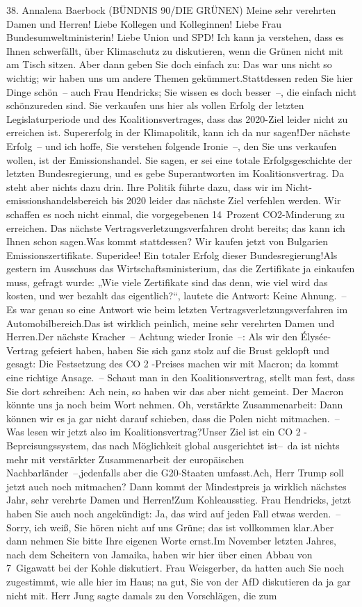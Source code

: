 \documentclass{article}
\begin{document}
	38. Annalena Baerbock (BÜNDNIS 90/DIE GRÜNEN) Meine sehr verehrten Damen und Herren! Liebe Kollegen und Kolleginnen! Liebe Frau Bundesumweltministerin! Liebe Union und SPD! Ich kann ja verstehen, dass es Ihnen schwerfällt, über Klimaschutz zu diskutieren, wenn die Grünen nicht mit am Tisch sitzen. Aber dann geben Sie doch einfach zu: Das war uns nicht so wichtig; wir haben uns um andere Themen gekümmert.Stattdessen reden Sie hier Dinge schön – auch Frau Hendricks; Sie wissen es doch besser –, die einfach nicht schönzureden sind. Sie verkaufen uns hier als vollen Erfolg der letzten Legislaturperiode und des Koalitionsvertrages, dass das 2020-Ziel leider nicht zu erreichen ist. Supererfolg in der Klimapolitik, kann ich da nur sagen!Der nächste Erfolg – und ich hoffe, Sie verstehen folgende Ironie –, den Sie uns verkaufen wollen, ist der Emissionshandel. Sie sagen, er sei eine totale Erfolgsgeschichte der letzten Bundesregierung, und es gebe Superantworten im Koalitionsvertrag. Da steht aber nichts dazu drin. Ihre Politik führte dazu, dass wir im Nicht­emissionshandelsbereich bis 2020 leider das nächste Ziel verfehlen werden. Wir schaffen es noch nicht einmal, die vorgegebenen 14 Prozent CO2-Minderung zu erreichen. Das nächste Vertragsverletzungsverfahren droht bereits; das kann ich Ihnen schon sagen.Was kommt stattdessen? Wir kaufen jetzt von Bulgarien Emissionszertifikate. Superidee! Ein totaler Erfolg dieser Bundesregierung!Als gestern im Ausschuss das Wirtschaftsministerium, das die Zertifikate ja einkaufen muss, gefragt wurde: „Wie viele Zertifikate sind das denn, wie viel wird das kosten, und wer bezahlt das eigentlich?“, lautete die Antwort: Keine Ahnung. – Es war genau so eine Antwort wie beim letzten Vertragsverletzungsverfahren im Automobilbereich.Das ist wirklich peinlich, meine sehr verehrten Damen und Herren.Der nächste Kracher – Achtung wieder Ironie –: Als wir den Élysée-Vertrag gefeiert haben, haben Sie sich ganz stolz auf die Brust geklopft und gesagt: Die Festsetzung des CO 2 -Preises machen wir mit Macron; da kommt eine richtige Ansage. – Schaut man in den Koalitionsvertrag, stellt man fest, dass Sie dort schreiben: Ach nein, so haben wir das aber nicht gemeint. Der Macron könnte uns ja noch beim Wort nehmen. Oh, verstärkte Zusammenarbeit: Dann können wir es ja gar nicht darauf schieben, dass die Polen nicht mitmachen. – Was lesen wir jetzt also im Koalitionsvertrag?Unser Ziel ist ein CO 2 -Bepreisungssystem, das nach Möglichkeit global ausgerichtet ist– da ist nichts mehr mit verstärkter Zusammenarbeit der europäischen Nachbarländer –,jedenfalls aber die G20-Staaten umfasst.Ach, Herr Trump soll jetzt auch noch mitmachen? Dann kommt der Mindestpreis ja wirklich nächstes Jahr, sehr verehrte Damen und Herren!Zum Kohleausstieg. Frau Hendricks, jetzt haben Sie auch noch angekündigt: Ja, das wird auf jeden Fall etwas werden. – Sorry, ich weiß, Sie hören nicht auf uns Grüne; das ist vollkommen klar.Aber dann nehmen Sie bitte Ihre eigenen Worte ernst.Im November letzten Jahres, nach dem Scheitern von Jamaika, haben wir hier über einen Abbau von 7 Gigawatt bei der Kohle diskutiert. Frau Weisgerber, da hatten auch Sie noch zugestimmt, wie alle hier im Haus; na gut, Sie von der AfD diskutieren da ja gar nicht mit. Herr Jung sagte damals zu den Vorschlägen, die zum 
\end{document}
